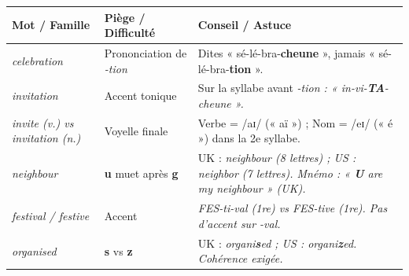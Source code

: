 \documentclass[11pt]{article}
\newcommand{\eng}[1]{\ifmmode\text{\textit{#1}}\else\begingroup\selectlanguage{english}\itshape #1\endgroup\fi}
\begin{document}
\begin{propriete}
\begin{center}
\begin{tabularx}{\linewidth}{|X|X|X|}
\hline
\rowcolor{popgoldL}
\textbf{Mot / Famille} & \textbf{Piège / Difficulté} & \textbf{Conseil / Astuce} \\
\hline
\eng{celebration} & Prononciation de \eng{-tion} & Dites « sé-lé-bra-\textbf{cheune} », jamais « sé-lé-bra-\textbf{tion} ». \\
\eng{invitation} & Accent tonique & Sur la syllabe avant \eng{-tion} : « in-vi-\textbf{TA}-cheune ». \\
\eng{invite} (v.) vs \eng{invitation} (n.) & Voyelle finale & Verbe = /aɪ/ (« aï ») ; Nom = /eɪ/ (« é ») dans la 2e syllabe. \\
\eng{neighbour} & \textbf{u} muet après \textbf{g} & UK : \eng{neighbour} (8 lettres) ; US : \eng{neighbor} (7 lettres). Mnémo : « \textbf{U} are my neighbour » (UK). \\
\eng{festival} / \eng{festive} & Accent & \eng{FES-ti-val} (1re) vs \eng{FES-tive} (1re). Pas d'accent sur \eng{-val}. \\
\eng{organised} & \textbf{s} vs \textbf{z} & UK : \eng{organi\textbf{s}ed} ; US : \eng{organi\textbf{z}ed}. Cohérence exigée. \\
\hline
\end{tabularx}
\end{center}
\end{propriete}
\end{document}
